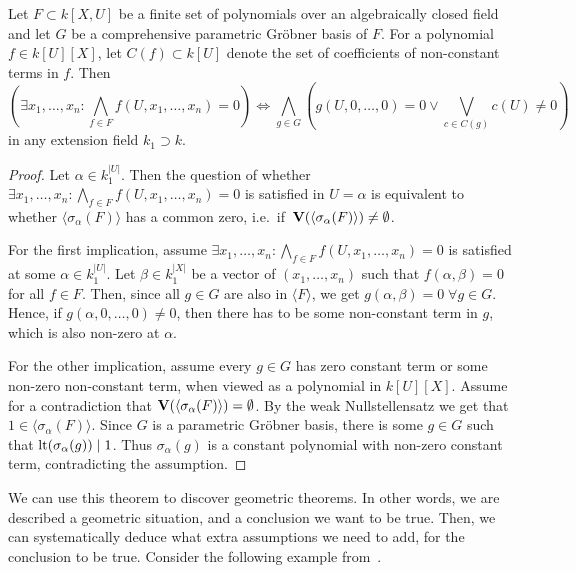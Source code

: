 \begin{theorem}
  Let $F \subset k[X, U]$ be a finite set of polynomials over an algebraically closed field and let $G$ be a comprehensive parametric Gröbner basis of $F$. For a polynomial $f \in k[U][X]$, let $C(f) \subset k[U]$ denote the set of coefficients of non-constant terms in $f$. Then \[ \left(\exists x_{1}, \dots, x_{n} : \bigwedge_{f \in F} f(U, x_{1}, \dots, x_{n}) = 0 \right) \iff \bigwedge_{g \in G} \left( g(U, 0, \dots, 0) = 0 \lor \bigvee_{c \in C(g)} c(U) \neq 0 \right)\] in any extension field $k_{1} \supset k$.
\end{theorem}
\begin{proof}
  Let $\alpha \in k_{1}^{|U|}$. Then the question of whether $\exists x_{1}, \dots, x_{n} : \bigwedge_{f \in F} f(U, x_{1}, \dots, x_{n}) = 0$ is satisfied in $U = \alpha$ is equivalent to whether $\langle \sigma_{\alpha}(F) \rangle$ has a common zero, i.e.\ if $\,\operatorname{\mathbf V}(\langle \sigma_{\alpha}(F) \rangle) \neq \emptyset$.

  For the first implication, assume $\exists x_{1}, \dots, x_{n} : \bigwedge_{f \in F} f(U, x_{1}, \dots, x_{n}) = 0$ is satisfied at some $\alpha \in k_{1}^{|U|}$. Let $\beta \in k_{1}^{|X|}$ be a vector of $(x_{1}, \dots, x_{n})$ such that $f(\alpha, \beta) = 0$ for all $f \in F$. Then, since all $g \in G$ are also in $\langle F \rangle$, we get $g(\alpha, \beta) = 0 \; \forall g \in G$. Hence, if $g(\alpha, 0, \dots, 0) \neq 0$, then there has to be some non-constant term in $g$, which is also non-zero at $\alpha$.

  For the other implication, assume every $g \in G$ has zero constant term or some non-zero non-constant term, when viewed as a polynomial in $k[U][X]$. Assume for a contradiction that $\operatorname{\mathbf V}(\langle \sigma_{\alpha}(F) \rangle) = \emptyset$. By the weak Nullstellensatz we get that $1 \in \langle \sigma_{\alpha}(F) \rangle$. Since $G$ is a parametric Gröbner basis, there is some $g \in G$ such that $\operatorname{lt}(\sigma_{\alpha}(g)) \mid 1$. Thus $\sigma_{\alpha}(g)$ is a constant polynomial with non-zero constant term, contradicting the assumption.
\end{proof}

We can use this theorem to discover geometric theorems. In other words, we are described a geometric situation, and a conclusion we want to be true. Then, we can systematically deduce what extra assumptions we need to add, for the conclusion to be true. Consider the following example from~\cite{MONTES20101391}.

